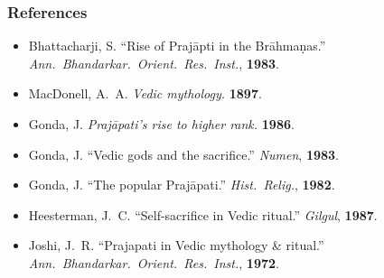 \documentclass[pdf]{beamer}
\begin{document}
\begin{frame} \frametitle{References}
\begin{itemize}
	\item Bhattacharji, S. ``Rise of Prajāpti in the Brāhmaṇas.'' \textit{Ann.~Bhandarkar.~Orient.~Res.~Inst.}, \textbf{1983}.
	\item MacDonell, A.~A. \textit{Vedic mythology.} \textbf{1897}.
	\item Gonda, J. \textit{Prajāpati's rise to higher rank.} \textbf{1986}.
	\item Gonda, J. ``Vedic gods and the sacrifice.'' \textit{Numen}, \textbf{1983}.
	\item Gonda, J. ``The popular Prajāpati.'' \textit{Hist.~Relig.}, \textbf{1982}.
	\item Heesterman, J.~C. ``Self-sacrifice in Vedic ritual.'' \textit{Gilgul}, \textbf{1987}.
	\item Joshi, J.~R. ``Prajapati in Vedic mythology \& ritual.'' \textit{Ann.~Bhandarkar.~Orient.~Res.~Inst.}, \textbf{1972}.
\end{itemize}
\end{frame}

\end{document}
